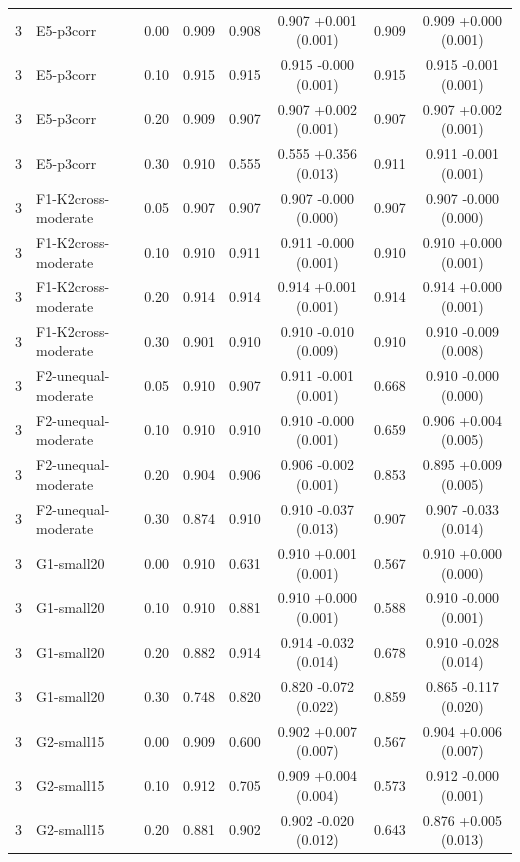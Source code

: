 {\begin{longtable}{llcccccc}
3 & E5-p3corr & 0.00 & 0.909 & 0.908 & 0.907 +0.001 (0.001) & 0.909 & 0.909 +0.000 (0.001) \\
3 & E5-p3corr & 0.10 & 0.915 & 0.915 & 0.915 -0.000 (0.001) & 0.915 & 0.915 -0.001 (0.001) \\
3 & E5-p3corr & 0.20 & 0.909 & 0.907 & 0.907 +0.002 (0.001) & 0.907 & 0.907 +0.002 (0.001) \\
3 & E5-p3corr & 0.30 & 0.910 & 0.555 & 0.555 +0.356 (0.013) & 0.911 & 0.911 -0.001 (0.001) \\
3 & F1-K2cross-moderate & 0.05 & 0.907 & 0.907 & 0.907 -0.000 (0.000) & 0.907 & 0.907 -0.000 (0.000) \\
3 & F1-K2cross-moderate & 0.10 & 0.910 & 0.911 & 0.911 -0.000 (0.001) & 0.910 & 0.910 +0.000 (0.001) \\
3 & F1-K2cross-moderate & 0.20 & 0.914 & 0.914 & 0.914 +0.001 (0.001) & 0.914 & 0.914 +0.000 (0.001) \\
3 & F1-K2cross-moderate & 0.30 & 0.901 & 0.910 & 0.910 -0.010 (0.009) & 0.910 & 0.910 -0.009 (0.008) \\
3 & F2-unequal-moderate & 0.05 & 0.910 & 0.907 & 0.911 -0.001 (0.001) & 0.668 & 0.910 -0.000 (0.000) \\
3 & F2-unequal-moderate & 0.10 & 0.910 & 0.910 & 0.910 -0.000 (0.001) & 0.659 & 0.906 +0.004 (0.005) \\
3 & F2-unequal-moderate & 0.20 & 0.904 & 0.906 & 0.906 -0.002 (0.001) & 0.853 & 0.895 +0.009 (0.005) \\
3 & F2-unequal-moderate & 0.30 & 0.874 & 0.910 & 0.910 -0.037 (0.013) & 0.907 & 0.907 -0.033 (0.014) \\
3 & G1-small20 & 0.00 & 0.910 & 0.631 & 0.910 +0.001 (0.001) & 0.567 & 0.910 +0.000 (0.000) \\
3 & G1-small20 & 0.10 & 0.910 & 0.881 & 0.910 +0.000 (0.001) & 0.588 & 0.910 -0.000 (0.001) \\
3 & G1-small20 & 0.20 & 0.882 & 0.914 & 0.914 -0.032 (0.014) & 0.678 & 0.910 -0.028 (0.014) \\
3 & G1-small20 & 0.30 & 0.748 & 0.820 & 0.820 -0.072 (0.022) & 0.859 & 0.865 -0.117 (0.020) \\
3 & G2-small15 & 0.00 & 0.909 & 0.600 & 0.902 +0.007 (0.007) & 0.567 & 0.904 +0.006 (0.007) \\
3 & G2-small15 & 0.10 & 0.912 & 0.705 & 0.909 +0.004 (0.004) & 0.573 & 0.912 -0.000 (0.001) \\
3 & G2-small15 & 0.20 & 0.881 & 0.902 & 0.902 -0.020 (0.012) & 0.643 & 0.876 +0.005 (0.013) \\

\end{longtable}}
